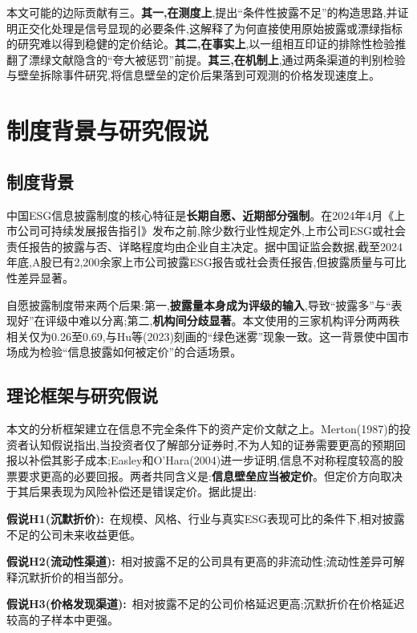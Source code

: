 \documentclass[UTF8, a4paper, fontset=fandol, zihao=-4]{ctexart}
\begin{document}
本文可能的边际贡献有三。\textbf{其一,在测度上},提出“条件性披露不足”的构造思路,并证明正交化处理是信号显现的必要条件,这解释了为何直接使用原始披露或漂绿指标的研究难以得到稳健的定价结论。\textbf{其二,在事实上},以一组相互印证的排除性检验推翻了漂绿文献隐含的“夸大被惩罚”前提。\textbf{其三,在机制上},通过两条渠道的判别检验与壁垒拆除事件研究,将信息壁垒的定价后果落到可观测的价格发现速度上。

\section{制度背景与研究假说}

\subsection{制度背景}

中国ESG信息披露制度的核心特征是\textbf{长期自愿、近期部分强制}。在2024年4月《上市公司可持续发展报告指引》发布之前,除少数行业性规定外,上市公司ESG或社会责任报告的披露与否、详略程度均由企业自主决定。据中国证监会数据,截至2024年底,A股已有2{,}200余家上市公司披露ESG报告或社会责任报告,但披露质量与可比性差异显著。

自愿披露制度带来两个后果:第一,\textbf{披露量本身成为评级的输入},导致“披露多”与“表现好”在评级中难以分离;第二,\textbf{机构间分歧显著}。本文使用的三家机构评分两两秩相关仅为0.26至0.69,与Hu等(2023)刻画的“绿色迷雾”现象一致。这一背景使中国市场成为检验“信息披露如何被定价”的合适场景。

\subsection{理论框架与研究假说}

本文的分析框架建立在信息不完全条件下的资产定价文献之上。Merton(1987)的投资者认知假说指出,当投资者仅了解部分证券时,不为人知的证券需要更高的预期回报以补偿其影子成本;Easley和O'Hara(2004)进一步证明,信息不对称程度较高的股票要求更高的必要回报。两者共同含义是:\textbf{信息壁垒应当被定价}。但定价方向取决于其后果表现为风险补偿还是错误定价。据此提出:

\vspace{2pt}
\noindent\textbf{假说H1(沉默折价):}~在规模、风格、行业与真实ESG表现可比的条件下,相对披露不足的公司未来收益更低。

\vspace{2pt}
\noindent\textbf{假说H2(流动性渠道):}~相对披露不足的公司具有更高的非流动性;流动性差异可解释沉默折价的相当部分。

\vspace{2pt}
\noindent\textbf{假说H3(价格发现渠道):}~相对披露不足的公司价格延迟更高;沉默折价在价格延迟较高的子样本中更强。
\end{document}
